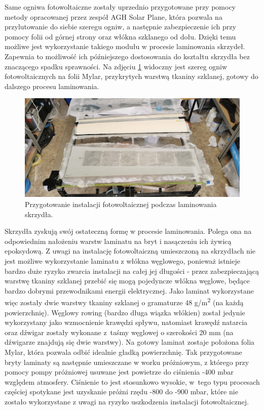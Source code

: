 \documentclass[12pt, a4paper]{article}
\begin{document}
Same ogniwa fotowoltaiczne zostały uprzednio przygotowane przy pomocy metody opracowanej przez zespół AGH Solar Plane, która pozwala na przylutowanie do siebie szeregu ogniw, a następnie zabezpieczenie ich przy pomocy folii od górnej strony oraz włókna szklanego od dołu. Dzięki temu możliwe jest wykorzystanie takiego modułu w procesie laminowania skrzydeł. Zapewnia to możliwość ich późniejszego dostosowania do kształtu skrzydła bez znaczącego spadku sprawności. Na zdjęciu \ref{fig:laminowanie} widoczny jest szereg ogniw fotowoltaicznych na folii Mylar, przykrytych warstwą tkaniny szklanej, gotowy do dalszego procesu laminowania.

 \begin{figure}[ht]
    \centering
    \includegraphics[width=1\textwidth]{budowa7}
    \caption{Przygotowanie instalacji fotowoltaicznej podczas laminowania skrzydła.}
    \label{fig:laminowanie}
\end{figure}

Skrzydła zyskują swój ostateczną formę w procesie laminowania. Polega ona na odpowiednim nałożeniu warstw laminatu na bryt i nasączeniu ich żywicą epoksydową. Z uwagi na instalację fotowoltaiczną umieszczoną na skrzydłach nie jest możliwe wykorzystanie laminatu z włókna węglowego, ponieważ istnieje bardzo duże ryzyko zwarcia instalacji na całej jej długości - przez zabezpieczającą warstwę tkaniny szklanej przebić się mogą pojedyncze włókna węglowe, będące bardzo dobrymi przewodnikami energii elektrycznej. Jako laminat wykorzystane więc zostały dwie warstwy tkaniny szklanej o gramaturze 48 g/m\textsuperscript{2} (na każdą powierzchnię). Węglowy rowing (bardzo długa wiązka włókien) został jedynie wykorzystany jako wzmocnienie krawędzi spływu, natomiast krawędź natarcia oraz dźwigar zostały wykonane z~taśmy węglowej o szerokości 20 mm (na dźwigarze znajdują się dwie warstwy). Na gotowy laminat zostaje położona folia Mylar, która pozwala odbić idealnie gładką powierzchnię. Tak przygotowane bryty laminaty są następnie umieszczane w worku próżniowym, z którego przy pomocy pompy próżniowej usuwane jest powietrze do ciśnienia -400 mbar względem atmosfery. Ciśnienie to jest stosunkowo wysokie, w~tego typu procesach częściej spotykane jest uzyskanie próżni rzędu -800 do -900 mbar, które nie zostało wykorzystane z uwagi na ryzyko uszkodzenia instalacji fotowoltaicznej.
\end{document}
